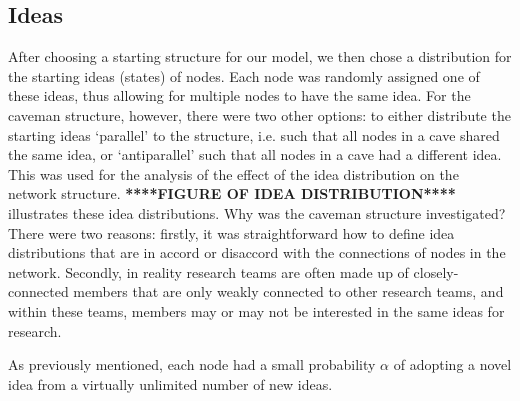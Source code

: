 \subsection{Ideas}

After choosing a starting structure for our model, we then chose a distribution for the starting ideas (states) of nodes. Each node was randomly assigned one of these ideas, thus allowing for multiple nodes to have the same idea. For the caveman structure, however, there were two other options: to either distribute the starting ideas `parallel' to the structure, i.e. such that all nodes in a cave shared the same idea, or `antiparallel' such that all nodes in a cave had a different idea. This was used for the analysis of the effect of the idea distribution on the network structure. \textbf{****FIGURE OF IDEA DISTRIBUTION****} illustrates these idea distributions. Why was the caveman structure investigated? There were two reasons: firstly, it was straightforward how to define idea distributions that are in accord or disaccord with the connections of nodes in the network. Secondly, in reality research teams are often made up of closely-connected members that are only weakly connected to other research teams, and within these teams, members may or may not be interested in the same ideas for research. 

As previously mentioned, each node had a small probability $\alpha$ of adopting a novel idea from a virtually unlimited number of new ideas.